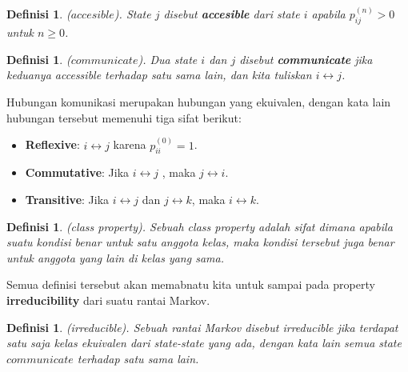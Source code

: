 \documentclass[11pt,b5paper,twoside]{book}
\newtheorem{definition}[theorem]{Definisi}
\begin{document}
		\begin{definition} ($accesible$).
			State $j$ disebut \textbf{accesible} dari state $i$ apabila $p_{ij}^{(n)} > 0$ untuk $n \geq 0$.
		\end{definition}
	
		\begin{definition} ($communicate$).
			Dua state $i$ dan $j$ disebut \textbf{communicate} jika keduanya accessible terhadap satu sama lain, dan kita tuliskan $ i \leftrightarrow j$.
		\end{definition}
		 
		 \noindent Hubungan komunikasi merupakan hubungan yang ekuivalen, dengan kata lain hubungan tersebut memenuhi tiga sifat berikut:
		 
		 \begin{itemize}
		 	\item \textbf{Reflexive}: $ i \leftrightarrow j$ karena $p_{ii}^{(0)} =1$.
		 	
		 	\item \textbf{Commutative}: Jika $ i \leftrightarrow j$ , maka $ j \leftrightarrow i$.
		 	
		 	\item  \textbf{Transitive}: Jika  $ i \leftrightarrow j$ dan $ j \leftrightarrow k$, maka $ i \leftrightarrow k$.
		 \end{itemize}
		
		\begin{definition} (class property).
			Sebuah class property adalah sifat dimana apabila suatu kondisi benar untuk satu anggota kelas, maka kondisi tersebut juga benar untuk anggota yang lain di kelas yang sama.
		\end{definition}
	
	\noindent Semua definisi tersebut akan memabnatu kita untuk sampai pada property \textbf{irreducibility} dari suatu rantai Markov.
	
	\begin{definition} (irreducible).
		Sebuah rantai Markov disebut irreducible jika terdapat satu saja kelas ekuivalen dari state-state yang ada, dengan kata lain semua state $communicate$ terhadap satu sama lain.
	\end{definition}
\end{document}
